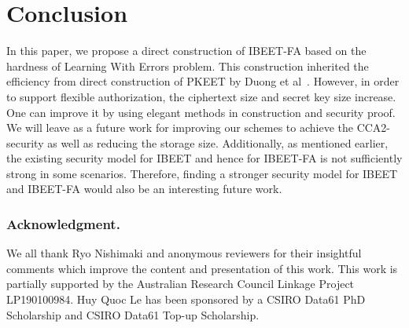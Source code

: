 \documentclass[runningheads,10pt]{llncs}
\begin{document}

\section{Conclusion}
In this paper, we propose a direct construction of IBEET-FA based on the hardness of Learning With Errors problem. This construction inherited the efficiency from direct construction of PKEET by Duong et al~{\cite{PKEET-FA-Duong20,IBEET-Duong19}}. However, in order to support flexible authorization, the ciphertext size and secret key size increase. One can improve it by using elegant methods in construction and security proof. We will leave as a future work for improving our schemes to achieve the CCA2-security as well as reducing the storage size. Additionally, as mentioned earlier, the existing security model for IBEET and hence for IBEET-FA is not sufficiently strong in some scenarios. Therefore, finding  a stronger security model for IBEET and IBEET-FA would also be an interesting future work.

\subsubsection{Acknowledgment.} 
We all thank Ryo Nishimaki and anonymous reviewers for their insightful comments which improve the content and presentation of  this work.  This work is partially supported by the Australian Research Council Linkage Project LP190100984. Huy Quoc Le has been sponsored by a CSIRO Data61 PhD Scholarship and CSIRO Data61 Top-up Scholarship. 

\end{document}
